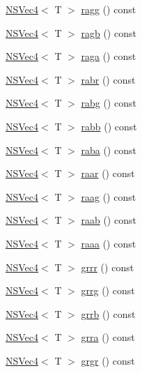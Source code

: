 \begin{DoxyCompactItemize}
\item 
\hyperlink{structNSVec4}{N\-S\-Vec4}$<$ T $>$ \hyperlink{structNSVec4_a50944eb609c2f1bba7a6fe83b8a4149e}{ragg} () const 
\item 
\hyperlink{structNSVec4}{N\-S\-Vec4}$<$ T $>$ \hyperlink{structNSVec4_ab6f71171f83ca04b1e93225013822ba1}{ragb} () const 
\item 
\hyperlink{structNSVec4}{N\-S\-Vec4}$<$ T $>$ \hyperlink{structNSVec4_ab4fb5f2c6b6813b782e577c4f1d6b87a}{raga} () const 
\item 
\hyperlink{structNSVec4}{N\-S\-Vec4}$<$ T $>$ \hyperlink{structNSVec4_ac0f79c2939e265422adfeebcb6ccc51f}{rabr} () const 
\item 
\hyperlink{structNSVec4}{N\-S\-Vec4}$<$ T $>$ \hyperlink{structNSVec4_a480a1b0d229dfce5eba7213ea1e6d412}{rabg} () const 
\item 
\hyperlink{structNSVec4}{N\-S\-Vec4}$<$ T $>$ \hyperlink{structNSVec4_acab18d5f38c366082fe3e85859c026a9}{rabb} () const 
\item 
\hyperlink{structNSVec4}{N\-S\-Vec4}$<$ T $>$ \hyperlink{structNSVec4_a41041aef44ac4a2f4b16d7fe723852d3}{raba} () const 
\item 
\hyperlink{structNSVec4}{N\-S\-Vec4}$<$ T $>$ \hyperlink{structNSVec4_a64bf5445ca129919000921cfd4d039fc}{raar} () const 
\item 
\hyperlink{structNSVec4}{N\-S\-Vec4}$<$ T $>$ \hyperlink{structNSVec4_a4c8b0dc37247e090468841e7c8b64046}{raag} () const 
\item 
\hyperlink{structNSVec4}{N\-S\-Vec4}$<$ T $>$ \hyperlink{structNSVec4_a0ca44652d0da2a08d07c3825fec82688}{raab} () const 
\item 
\hyperlink{structNSVec4}{N\-S\-Vec4}$<$ T $>$ \hyperlink{structNSVec4_a81168eeef52c0e6b1cd0c01c33c947f3}{raaa} () const 
\item 
\hyperlink{structNSVec4}{N\-S\-Vec4}$<$ T $>$ \hyperlink{structNSVec4_a347a151e392ee8c104be406097b5a31c}{grrr} () const 
\item 
\hyperlink{structNSVec4}{N\-S\-Vec4}$<$ T $>$ \hyperlink{structNSVec4_a39530a8111628fa9324396a70974cd60}{grrg} () const 
\item 
\hyperlink{structNSVec4}{N\-S\-Vec4}$<$ T $>$ \hyperlink{structNSVec4_a1353ee80758477618079c4a5124104d6}{grrb} () const 
\item 
\hyperlink{structNSVec4}{N\-S\-Vec4}$<$ T $>$ \hyperlink{structNSVec4_ad755b3f59d59a8de3dc0d0b75c511aed}{grra} () const 
\item 
\hyperlink{structNSVec4}{N\-S\-Vec4}$<$ T $>$ \hyperlink{structNSVec4_aa8adf6473d9e3672b4ffb8831cb4007f}{grgr} () const 

\end{DoxyCompactItemize}
